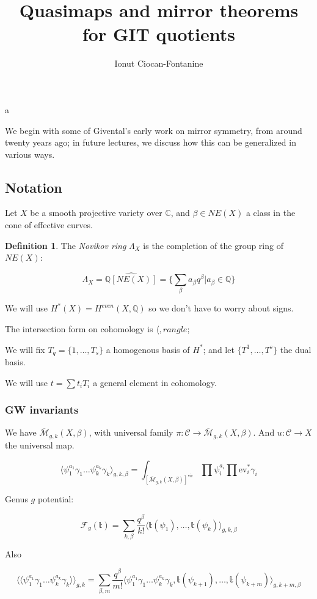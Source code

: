 \documentclass{amsart}
\title{Quasimaps and mirror theorems for GIT quotients}
\author{Ionut Ciocan-Fontanine}
\theoremstyle{definition}
\newtheorem{definition}[dummy]{Definition}
\newcommand{\Mbar}{\overline{\mathcal{M}}}
\newcommand{\Q}{\mathbb{Q}}
\newcommand{\C}{\mathbb{C}}
\newcommand{\one}{1}
\newcommand{\ttt}{\mathbb{t}}
\newcommand{\ev}{\text{ev}}
\newcommand{\vir}{\text{vir}}
\begin{document}
a
\maketitle

We begin with some of Givental's early work on mirror symmetry, from around twenty years ago; in future lectures, we discuss how this can be generalized in various ways.

\subsection{Notation}

Let $X$ be a smooth projective variety over $\C$, and $\beta\in NE(X)$ a class in the cone of effective curves.

\begin{definition}
The \emph{Novikov ring} $\Lambda_X$ is the completion of the group ring of $NE(X)$:

$$\Lambda_X=\hat{\Q[NE(X)]}=\{\sum_\beta a_\beta q^\beta|a_\beta\in\Q\}$$
\end{definition}

We will use $H^*(X)=H^{even}(X,\Q)$ so we don't have to worry about signs.

The intersection form on cohomology is $\langle, rangle$; 


We will fix $T_q=\{\one,\dots, T_s\}$ a homogenous basis of $H^*$; and let $\{T^1,\dots, T^s\}$ the dual basis.

We will use $t=\sum t_i T_i$ a general element in cohomology.

\subsubsection{GW invariants}

We have $\Mbar_{g,k}(X,\beta)$, with universal family $\pi:\mathcal{C}\to\Mbar_{g,k}(X,\beta)$.  And $u:\mathcal{C}\to X$ the universal map.

$$\langle \psi_1^{a_1}\gamma_1\dots \psi_k^{a_k}\gamma_k\rangle_{g,k,\beta}
=\int_{[\Mbar_{g,k}(X,\beta)]^{\vir}} \prod \psi_i^{a_i} \prod \ev_i^* \gamma_i$$



Genus $g$ potential:

$$\mathcal{F}_g(\ttt)=\sum_{k,\beta} \frac{q^\beta}{k!} \langle \ttt(\psi_1),\dots,\ttt(\psi_k)\rangle_{g,k,\beta}$$

Also

$$\langle\langle \psi_1^{a_1}\gamma_1\dots \psi_k^{a_k}\gamma_k\rangle\rangle_{g,k}=\sum_{\beta,m}\frac{q^\beta}{m!}\langle \psi_1^{a_1}\gamma_1\dots \psi_k^{a_k}\gamma_k, \ttt(\psi_{k+1}),\dots,\ttt(\psi_{k+m})\rangle_{g,k+m,\beta}$$
\end{document}
